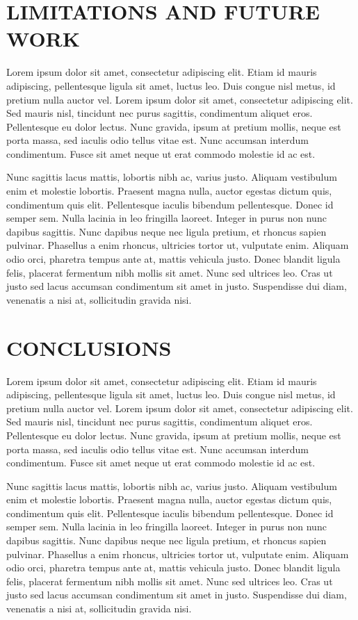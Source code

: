 \documentclass{sig-alternate}
\begin{document}
\section{LIMITATIONS AND FUTURE WORK}
\label{sec:future}
Lorem ipsum dolor sit amet, consectetur adipiscing elit. Etiam id mauris adipiscing, pellentesque ligula sit amet, luctus leo. 
Duis congue nisl metus, id pretium nulla auctor vel. Lorem ipsum dolor sit amet, consectetur adipiscing elit. Sed mauris nisl, 
tincidunt nec purus sagittis, condimentum aliquet eros. Pellentesque eu dolor lectus. Nunc gravida, ipsum at pretium mollis, neque 
est porta massa, sed iaculis odio tellus vitae est. Nunc accumsan interdum condimentum. Fusce sit amet neque ut erat commodo molestie id ac est.

Nunc sagittis lacus mattis, lobortis nibh ac, varius justo. Aliquam vestibulum enim et molestie lobortis. Praesent magna nulla, auctor
egestas dictum quis, condimentum quis elit. Pellentesque iaculis bibendum pellentesque. Donec id semper sem. Nulla lacinia in leo fringilla 
laoreet. Integer in purus non nunc dapibus sagittis. Nunc dapibus neque nec ligula pretium, et rhoncus sapien pulvinar. Phasellus a enim rhoncus,
 ultricies tortor ut, vulputate enim. Aliquam odio orci, pharetra tempus ante at, mattis vehicula justo. Donec blandit ligula felis, placerat 
 fermentum nibh mollis sit amet. Nunc sed ultrices leo. Cras ut justo sed lacus accumsan condimentum sit amet in justo. Suspendisse dui diam, 
 venenatis a nisi at, sollicitudin gravida nisi.
 
\section{CONCLUSIONS}
\label{sec:conclusions}
Lorem ipsum dolor sit amet, consectetur adipiscing elit. Etiam id mauris adipiscing, pellentesque ligula sit amet, luctus leo. 
Duis congue nisl metus, id pretium nulla auctor vel. Lorem ipsum dolor sit amet, consectetur adipiscing elit. Sed mauris nisl, 
tincidunt nec purus sagittis, condimentum aliquet eros. Pellentesque eu dolor lectus. Nunc gravida, ipsum at pretium mollis, neque 
est porta massa, sed iaculis odio tellus vitae est. Nunc accumsan interdum condimentum. Fusce sit amet neque ut erat commodo molestie id ac est.

Nunc sagittis lacus mattis, lobortis nibh ac, varius justo. Aliquam vestibulum enim et molestie lobortis. Praesent magna nulla, auctor
egestas dictum quis, condimentum quis elit. Pellentesque iaculis bibendum pellentesque. Donec id semper sem. Nulla lacinia in leo fringilla 
laoreet. Integer in purus non nunc dapibus sagittis. Nunc dapibus neque nec ligula pretium, et rhoncus sapien pulvinar. Phasellus a enim rhoncus,
 ultricies tortor ut, vulputate enim. Aliquam odio orci, pharetra tempus ante at, mattis vehicula justo. Donec blandit ligula felis, placerat 
 fermentum nibh mollis sit amet. Nunc sed ultrices leo. Cras ut justo sed lacus accumsan condimentum sit amet in justo. Suspendisse dui diam, 
 venenatis a nisi at, sollicitudin gravida nisi.
 



\balancecolumns
\end{document}

